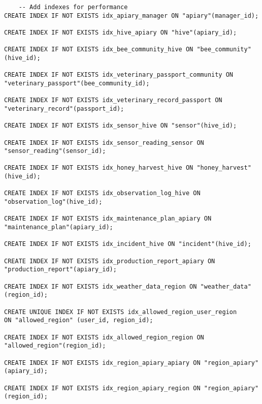 \documentclass{article}
\begin{document}
\begin{lstlisting}
    -- Add indexes for performance
CREATE INDEX IF NOT EXISTS idx_apiary_manager ON "apiary"(manager_id);

CREATE INDEX IF NOT EXISTS idx_hive_apiary ON "hive"(apiary_id);

CREATE INDEX IF NOT EXISTS idx_bee_community_hive ON "bee_community"(hive_id);

CREATE INDEX IF NOT EXISTS idx_veterinary_passport_community ON "veterinary_passport"(bee_community_id);

CREATE INDEX IF NOT EXISTS idx_veterinary_record_passport ON "veterinary_record"(passport_id);

CREATE INDEX IF NOT EXISTS idx_sensor_hive ON "sensor"(hive_id);

CREATE INDEX IF NOT EXISTS idx_sensor_reading_sensor ON "sensor_reading"(sensor_id);

CREATE INDEX IF NOT EXISTS idx_honey_harvest_hive ON "honey_harvest"(hive_id);

CREATE INDEX IF NOT EXISTS idx_observation_log_hive ON "observation_log"(hive_id);

CREATE INDEX IF NOT EXISTS idx_maintenance_plan_apiary ON "maintenance_plan"(apiary_id);

CREATE INDEX IF NOT EXISTS idx_incident_hive ON "incident"(hive_id);

CREATE INDEX IF NOT EXISTS idx_production_report_apiary ON "production_report"(apiary_id);

CREATE INDEX IF NOT EXISTS idx_weather_data_region ON "weather_data"(region_id);

CREATE UNIQUE INDEX IF NOT EXISTS idx_allowed_region_user_region
ON "allowed_region" (user_id, region_id);

CREATE INDEX IF NOT EXISTS idx_allowed_region_region ON "allowed_region"(region_id);

CREATE INDEX IF NOT EXISTS idx_region_apiary_apiary ON "region_apiary"(apiary_id);

CREATE INDEX IF NOT EXISTS idx_region_apiary_region ON "region_apiary"(region_id);

\end{lstlisting}
\end{document}
